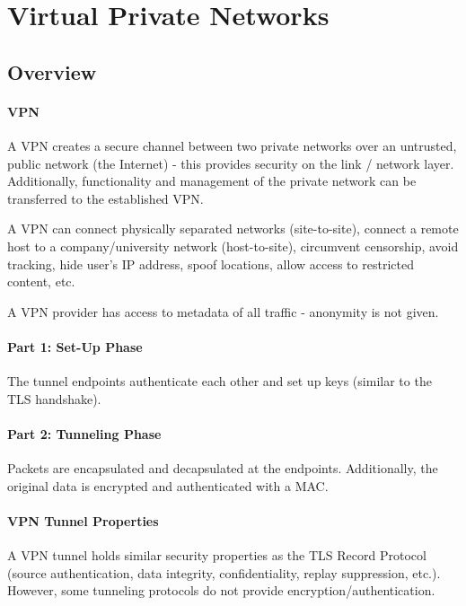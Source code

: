 \section{Virtual Private Networks}

\subsection{Overview}

\paragraph{VPN}
A VPN creates a secure channel between two private networks over an untrusted, public network (the Internet) - this provides security on the link / network layer. Additionally, functionality and management of the private network can be transferred to the established VPN.

A VPN can connect physically separated networks (site-to-site), connect a remote host to a company/university network (host-to-site), circumvent censorship, avoid tracking, hide user's IP address, spoof locations, allow access to restricted content, etc.

A VPN provider has access to metadata of all traffic - anonymity is not given.

\paragraph{Part 1: Set-Up Phase}
The tunnel endpoints authenticate each other and set up keys (similar to the TLS handshake).

\paragraph{Part 2: Tunneling Phase}
Packets are encapsulated and decapsulated at the endpoints. Additionally, the original data is encrypted and authenticated with a MAC.

\paragraph{VPN Tunnel Properties}
A VPN tunnel holds similar security properties as the TLS Record Protocol (source authentication, data integrity, confidentiality, replay suppression, etc.). However, some tunneling protocols do not provide encryption/authentication.

